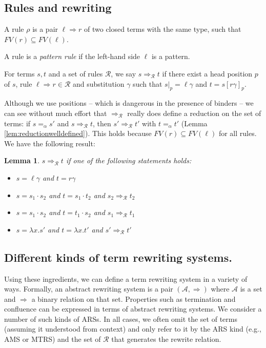 \documentclass{lmcs}
\theoremstyle{theorem}\newtheorem{theorem}{Theorem}
\theoremstyle{theorem}\newtheorem{lemma}[theorem]{Lemma}
\theoremstyle{theorem}\newtheorem{corollary}[theorem]{Corollary}
\theoremstyle{definition}\newtheorem{definition}[theorem]{Definition}
\theoremstyle{definition}\newtheorem{example}[theorem]{Example}
\newcommand{\Rules}{\mathcal{R}}
\newcommand{\FV}{\mathit{FV}}
\newcommand{\avar}{x}
\newcommand{\abs}[2]{\lambda #1.#2}
\newcommand{\arrz}{\Rightarrow}
\newcommand{\arr}[1]{\arrz_{#1}}
\begin{document}
\subsection{Rules and rewriting}

A rule $\rho$ is a pair $\ell \arrz r$ of two closed terms with the same type, such that
$\FV(r) \subseteq \FV(\ell)$.

A rule is a \emph{pattern rule} if the left-hand side $\ell$ is a pattern.

For terms $s,t$ and a set of rules $\Rules$, we say $s \arr{\Rules} t$ if there exist a head
position $p$ of $s$, rule $\ell \arrz r \in \Rules$ and substitution $\gamma$ such that $s|_p =
\ell\gamma$ and $t = s[r\gamma]_p$.

Although we use positions -- which is dangerous in the presence of binders -- we can see without
much effort that $\arr{\Rules}$ really does define a reduction on the set of terms: if
$s =_\alpha s'$ and $s \arr{\Rules} t$, then $s' \arr{\Rules} t'$ with $t =_\alpha t'$ (Lemma
\ref{lem:reductionwelldefined}).  This holds because $\FV(r) \subseteq \FV(\ell)$ for all rules.
We have the following result:

\begin{lemma} $s \arr{\Rules} t$ if one of the following statements holds:
\begin{itemize}
\item $s = \ell\gamma$ and $t = r\gamma$
\item $s = s_1 \cdot s_2$ and $t = s_1 \cdot t_2$ and $s_2 \arr{\Rules} t_2$
\item $s = s_1 \cdot s_2$ and $t = t_1 \cdot s_2$ and $s_1 \arr{\Rules} t_1$
\item $s = \abs{\avar}{s'}$ and $t = \abs{\avar}{t'}$ and $s' \arr{\Rules} t'$
\end{itemize}
\end{lemma}

\subsection{Different kinds of term rewriting systems.}

Using these ingredients, we can define a term rewriting system in a variety of ways.  Formally,
an abstract rewriting system is a pair $(\mathcal{A},\arrz)$ where $\mathcal{A}$ is a set and
$\arrz$ a binary relation on that set.  Properties such as termination and confluence can be
expressed in terms of abstract rewriting systems.  We consider a number of such kinds of ARSs.
In all cases, we often omit the set of terms (assuming it understood from context) and only
refer to it by the ARS kind (e.g., AMS or MTRS) and the set of $\Rules$ that generates the
rewrite relation.
\end{document}
